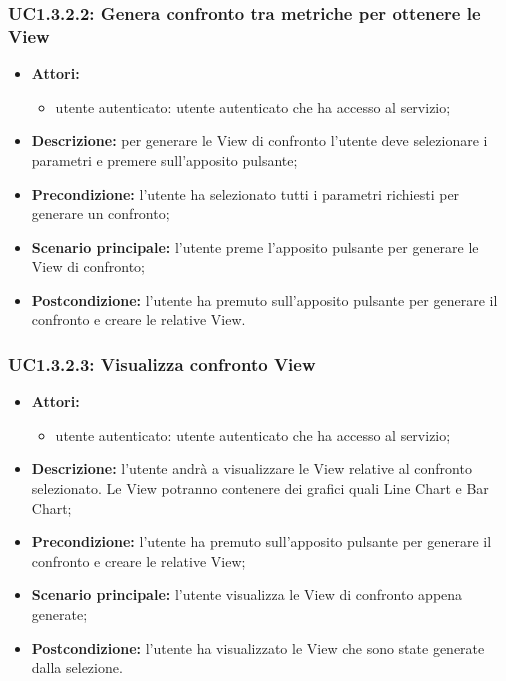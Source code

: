 \subsubsection{UC1.3.2.2: Genera confronto tra metriche per ottenere le View}
\begin{itemize}
	\item \textbf{Attori:}
	\begin{itemize}
		\item utente autenticato: utente autenticato che ha accesso al servizio;
	\end{itemize}
	\item \textbf{Descrizione:} per generare le View di confronto l'utente deve selezionare i parametri e premere sull'apposito pulsante;
	\item \textbf{Precondizione:} l'utente ha selezionato tutti i parametri richiesti per generare un confronto;
	\item \textbf{Scenario principale:} l'utente preme l'apposito pulsante per generare le View di confronto;
	\item \textbf{Postcondizione:} l'utente ha premuto sull'apposito pulsante per generare il confronto e creare le relative View.
\end{itemize}

\subsubsection{UC1.3.2.3: Visualizza confronto View}
\begin{itemize}
	\item \textbf{Attori:}
	\begin{itemize}
		\item utente autenticato: utente autenticato che ha accesso al servizio;
	\end{itemize}
	\item \textbf{Descrizione:} l'utente andrà a visualizzare le View relative al confronto selezionato. Le View potranno contenere dei grafici quali Line Chart e Bar Chart;
	\item \textbf{Precondizione:} l'utente ha premuto sull'apposito pulsante per generare il confronto e creare le relative View;
	\item \textbf{Scenario principale:} l'utente visualizza le View di confronto appena generate;
	\item \textbf{Postcondizione:} l'utente ha visualizzato le View che sono state generate dalla selezione.
\end{itemize}


